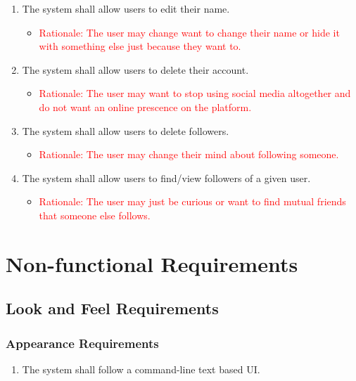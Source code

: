 \documentclass[12pt, titlepage]{article}
\begin{document}
\begin{enumerate}
    \item The system shall allow users to edit their name.
        \begin{itemize}
            \item \textcolor{red}{Rationale: The user may change want to change their name or hide it with something else just because they want to.}
        \end{itemize}
        
    \item The system shall allow users to delete their account.
        \begin{itemize}
            \item \textcolor{red}{Rationale: The user may want to stop using social media altogether and do not want an online prescence on the platform.}
        \end{itemize}
        
    \item The system shall allow users to delete followers.
        \begin{itemize}
            \item \textcolor{red}{Rationale: The user may change their mind about following someone.}
        \end{itemize}
        
    \item The system shall allow users to find/view followers of a given user.
        \begin{itemize}
            \item \textcolor{red}{Rationale: The user may just be curious or want to find mutual friends that someone else follows.}
        \end{itemize}
    
\end{enumerate}

\section{Non-functional Requirements}

\subsection{Look and Feel Requirements}
\subsubsection{Appearance Requirements}
    \begin{enumerate}
        \item The system shall follow a command-line text based UI.
    \end{enumerate}
\end{document}
